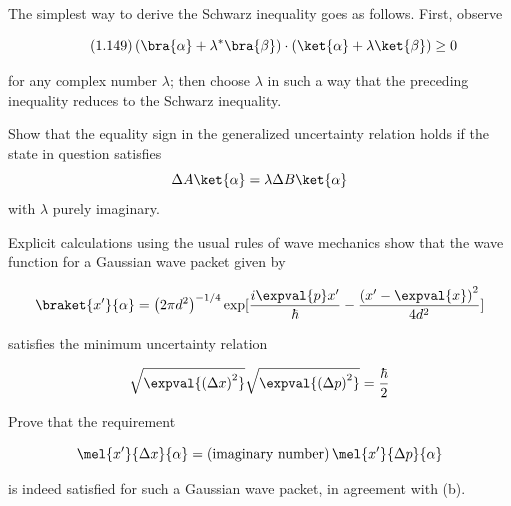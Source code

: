 \begin{question}

  \begin{questionpart}
    The simplest way to derive the Schwarz inequality goes as
    follows. First, observe

    \begin{equation*}
      \tag{1.149}
      \left(
      \bra{\alpha} + \lambda^{*}\bra{\beta} \right)
      \cdot
      \left( \ket{\alpha} + \lambda\ket{\beta} \right)
      \ge 0
    \end{equation*}

    for any complex number $\lambda$; then choose $\lambda$ in such a
    way that the preceding inequality reduces to the Schwarz
    inequality.
  \end{questionpart}

  \begin{questionpart}
    Show that the equality sign in the generalized uncertainty
    relation holds if the state in question satisfies
    \begin{equation*}
      \Delta A \ket{\alpha} = \lambda \Delta B \ket{\alpha}
    \end{equation*}
     with $\lambda$ purely imaginary.
  \end{questionpart}

  \begin{questionpart}
    Explicit calculations using the usual rules of wave mechanics
    show that the wave function for a Gaussian wave packet given by

    \begin{equation*}
      \braket{x'}{\alpha} = \left(2 \pi d^2\right)^{-1/4}
      \exp[
        \frac{i\expval{p}x'}{\hbar}
        -  \frac{\left(x' - \expval{x}\right)^2}{4d^2}
        ]
    \end{equation*}

    satisfies the minimum uncertainty relation
    
    \begin{equation*}
      \sqrt{\expval{\left(\Delta x\right)^2}}
      \sqrt{\expval{\left(\Delta p\right)^2}}
      = \frac{\hbar}{2}
    \end{equation*}

    Prove that the requirement

    \begin{equation*}
      \mel{x'}{\Delta x}{\alpha}
      = \left(\text{imaginary number}\right)
      \mel{x'}{\Delta p}{\alpha}
    \end{equation*}

    is indeed satisfied for such a Gaussian wave packet, in agreement
    with (b).
  \end{questionpart}

\end{question}

